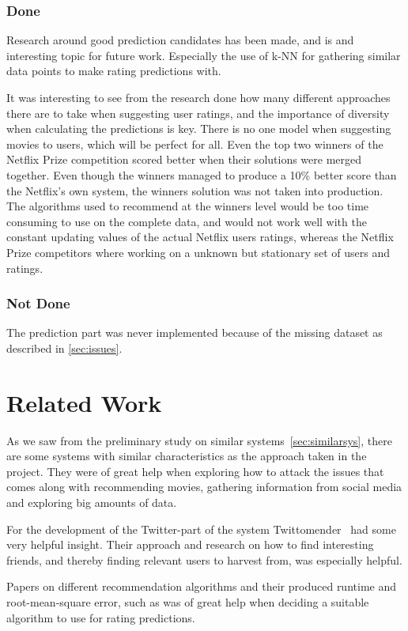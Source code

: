 \subsubsection{Done}
Research around good prediction candidates has been made, and is and interesting topic for future work. Especially the use of k-NN for gathering similar data points to make rating predictions with.

It was interesting to see from the research done how many different approaches there are to take when suggesting user ratings, and the importance of diversity when calculating the predictions is key. There is no one model when suggesting movies to users, which will be perfect for all. Even the top two winners of the Netflix Prize competition scored better when their solutions were merged together. Even though the winners managed to produce a 10\% better score than the Netflix's own system, the winners solution was not taken into production. The algorithms used to recommend at the winners level would be too time consuming to use on the complete data, and would not work well with the constant updating values of the actual Netflix users ratings, whereas the Netflix Prize competitors where working on a unknown but stationary set of users and ratings.

\subsubsection{Not Done}
The prediction part was never implemented because of the missing dataset as described in \ref{sec:issues}.


\section{Related Work}
As we saw from the preliminary study on similar systems~\ref{sec:similarsys}, there are some systems with similar characteristics as the approach taken in the project. They were of great help when exploring how to attack the issues that comes along with recommending movies, gathering information from social media and exploring big amounts of data.

For the development of the Twitter-part of the system Twittomender~\cite{twittomender} had some very helpful insight. Their approach and research on how to find interesting friends, and thereby finding relevant users to harvest from, was especially helpful.

Papers on different recommendation algorithms and their produced runtime and root-mean-square error, such as \cite{bigchaos-sol,alsMPI,BellKor-CF-TD} was of great help when deciding a suitable algorithm to use for rating predictions.

